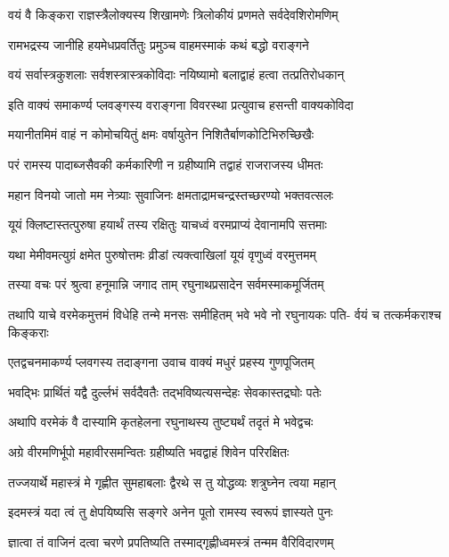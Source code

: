 \twolineshloka
{वयं वै किङ्करा राज्ञस्त्रैलोक्यस्य शिखामणेः}
{त्रिलोकीयं प्रणमते सर्वदेवशिरोमणिम्}%

\twolineshloka
{रामभद्रस्य जानीहि हयमेधप्रवर्तितुः}
{प्रमुञ्च वाहमस्माकं कथं बद्धो वराङ्गने}%

\twolineshloka
{वयं सर्वास्त्रकुशलाः सर्वशस्त्रास्त्रकोविदाः}
{नयिष्यामो बलाद्वाहं हत्वा तत्प्रतिरोधकान्}%

\twolineshloka
{इति वाक्यं समाकर्ण्य प्लवङ्गस्य वराङ्गना}
{विवरस्था प्रत्युवाच हसन्ती वाक्यकोविदा}%

\twolineshloka
{मयानीतमिमं वाहं न कोमोचयितुं क्षमः}
{वर्षायुतेन निशितैर्बाणकोटिभिरुच्छिखैः}%

\twolineshloka
{परं रामस्य पादाब्जसैवकी कर्मकारिणी}
{न ग्रहीष्यामि तद्वाहं राजराजस्य धीमतः}%

\twolineshloka
{महान विनयो जातो मम नेत्र्याः सुवाजिनः}
{क्षमताद्रामचन्द्रस्तच्छरण्यो भक्तवत्सलः}%

\twolineshloka
{यूयं क्लिष्टास्तत्पुरुषा हयार्थं तस्य रक्षितुः}
{याचध्वं वरमप्राप्यं देवानामपि सत्तमाः}%

\twolineshloka
{यथा मेमीवमत्युग्रं क्षमेत पुरुषोत्तमः}
{व्रीडां त्यक्त्वाखिलां यूयं वृणुध्वं वरमुत्तमम्}%

\twolineshloka
{तस्या वचः परं श्रुत्वा हनूमान्नि जगाद ताम्}
{रघुनाथप्रसादेन सर्वमस्माकमूर्जितम्}%

\fourlineindentedshloka
{तथापि याचे वरमेकमुत्तमं}
{विधेहि तन्मे मनसः समीहितम्}
{भवे भवे नो रघुनायकः पति-}
{र्वयं च तत्कर्मकराश्च किङ्कराः}%

\twolineshloka
{एतद्वचनमाकर्ण्य प्लवगस्य तदाङ्गना}
{उवाच वाक्यं मधुरं प्रहस्य गुणपूजितम्}%

\twolineshloka
{भवद्भिः प्रार्थितं यद्वै दुर्ल्लभं सर्वदैवतैः}
{तद्भविष्यत्यसन्देहः सेवकास्तद्रघोः पतेः}%

\twolineshloka
{अथापि वरमेकं वै दास्यामि कृतहेलना}
{रघुनाथस्य तुष्ट्यर्थं तदृतं मे भवेद्वचः}%

\twolineshloka
{अग्रे वीरमणिर्भूपो महावीरसमन्वितः}
{ग्रहीष्यति भवद्वाहं शिवेन परिरक्षितः}%

\twolineshloka
{तज्जयार्थे महास्त्रं मे गृह्णीत सुमहाबलाः}
{द्वैरथे स तु योद्धव्यः शत्रुघ्नेन त्वया महान्}%

\twolineshloka
{इदमस्त्रं यदा त्वं तु क्षेपयिष्यसि सङ्गरे}
{अनेन पूतो रामस्य स्वरूपं ज्ञास्यते पुनः}%

\twolineshloka
{ज्ञात्वा तं वाजिनं दत्वा चरणे प्रपतिष्यति}
{तस्माद्गृह्णीध्वमस्त्रं तन्मम वैरिविदारणम्}%


